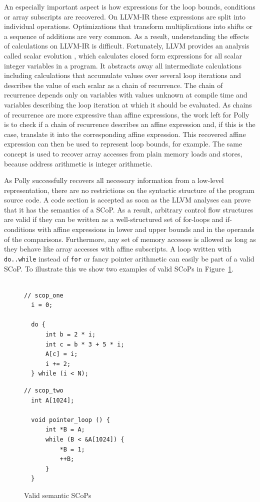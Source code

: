 An especially important aspect is how expressions for the loop bounds,
conditions or array subscripts are recovered. On LLVM-IR these expressions are
split into individual operations. Optimizations that transform multiplications into
shifts or a sequence of additions are very common. As a result, understanding
the effects of calculations on LLVM-IR is difficult.  Fortunately, LLVM
provides an analysis called scalar evolution \cite{Engelen01}, which calculates
closed form expressions for all scalar integer variables in a program.  It
abstracts away all intermediate calculations including calculations that
accumulate values over several loop iterations and describes the value of each
scalar as a chain of recurrence. The chain of recurrence
depends only on variables with values unknown at compile time and variables
describing the loop iteration at which it should be evaluated. As chains of
recurrence are more expressive than affine expressions, the work left for Polly
is to check if a chain of recurrence describes an affine expression and, if
this is the case, translate it into the corresponding affine expression. This
recovered affine expression can then be used to represent loop bounds, for
example.  The same concept is used to recover array accesses from plain memory
loads and stores, because address arithmetic is integer arithmetic.

As Polly successfully recovers all necessary information from a low-level
representation, there are no restrictions on the syntactic structure of the
program source code. A code section is accepted as soon as the LLVM analyses
can prove that it has the semantics of a SCoP. As a result, 
arbitrary control
flow structures are valid if they can be written as a well-structured set
of for-loops and if-conditions with affine expressions in lower and upper
bounds and in the operands of the comparisons. Furthermore, any set of
memory accesses is allowed as long as they behave like array accesses with affine subscripts.
A loop written
with \texttt{do..while} instead of \texttt{for} or fancy pointer arithmetic can easily be part of a valid SCoP.
To illustrate this we show two examples of valid SCoPs in Figure~\ref{semscop}.

\begin{figure}
\begin{verbatim}

// scop_one
  i = 0;
  
  do {
      int b = 2 * i;
      int c = b * 3 + 5 * i;
      A[c] = i;
      i += 2;
  } while (i < N);
\end{verbatim}

\begin{verbatim}
// scop_two
  int A[1024];
  
  void pointer_loop () {
      int *B = A;
      while (B < &A[1024]) {
          *B = 1;
          ++B;
      }
  }
\end{verbatim}
\caption{Valid semantic SCoPs}
\label{semscop}
\end{figure}

